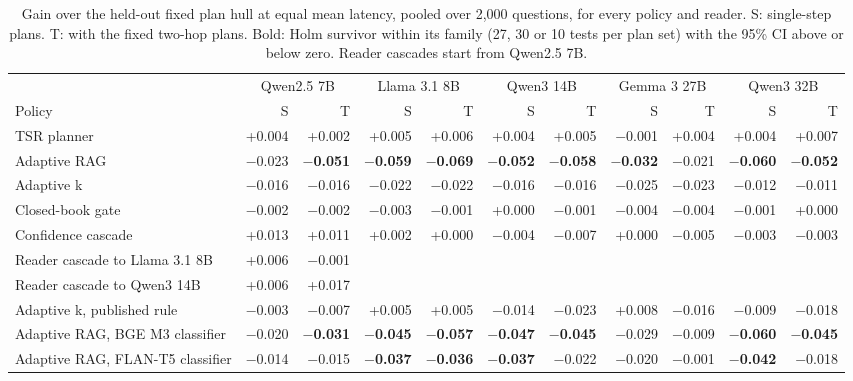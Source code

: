 \begin{table}[t]
\centering\footnotesize
\setlength{\tabcolsep}{4pt}
\caption{Gain over the held-out fixed plan hull at equal mean latency, pooled over 2,000 questions, for every policy and reader. S: single-step plans. T: with the fixed two-hop plans. Bold: Holm survivor within its family (27, 30 or 10 tests per plan set) with the 95\% CI above or below zero. Reader cascades start from Qwen2.5 7B.}
\label{tab:p_gains}
\begin{tabular*}{\linewidth}{@{\extracolsep{\fill}}lrrrrrrrrrr@{}}
\toprule
 & \multicolumn{2}{c}{Qwen2.5 7B} & \multicolumn{2}{c}{Llama 3.1 8B} & \multicolumn{2}{c}{Qwen3 14B} & \multicolumn{2}{c}{Gemma 3 27B} & \multicolumn{2}{c}{Qwen3 32B} \\
\cmidrule(lr){2-3}\cmidrule(lr){4-5}\cmidrule(lr){6-7}\cmidrule(lr){8-9}\cmidrule(l){10-11}
Policy & S & T & S & T & S & T & S & T & S & T \\
\midrule
TSR planner & +0.004 & +0.002 & +0.005 & +0.006 & +0.004 & +0.005 & $-$0.001 & +0.004 & +0.004 & +0.007 \\
Adaptive RAG & $-$0.023 & \textbf{$-$0.051} & \textbf{$-$0.059} & \textbf{$-$0.069} & \textbf{$-$0.052} & \textbf{$-$0.058} & \textbf{$-$0.032} & $-$0.021 & \textbf{$-$0.060} & \textbf{$-$0.052} \\
Adaptive k & $-$0.016 & $-$0.016 & $-$0.022 & $-$0.022 & $-$0.016 & $-$0.016 & $-$0.025 & $-$0.023 & $-$0.012 & $-$0.011 \\
Closed-book gate & $-$0.002 & $-$0.002 & $-$0.003 & $-$0.001 & +0.000 & $-$0.001 & $-$0.004 & $-$0.004 & $-$0.001 & +0.000 \\
Confidence cascade & +0.013 & +0.011 & +0.002 & +0.000 & $-$0.004 & $-$0.007 & +0.000 & $-$0.005 & $-$0.003 & $-$0.003 \\
Reader cascade to Llama 3.1 8B & +0.006 & $-$0.001 &  &  &  &  &  &  &  &  \\
Reader cascade to Qwen3 14B & +0.006 & +0.017 &  &  &  &  &  &  &  &  \\
\midrule
Adaptive k, published rule & $-$0.003 & $-$0.007 & +0.005 & +0.005 & $-$0.014 & $-$0.023 & +0.008 & $-$0.016 & $-$0.009 & $-$0.018 \\
Adaptive RAG, BGE M3 classifier & $-$0.020 & \textbf{$-$0.031} & \textbf{$-$0.045} & \textbf{$-$0.057} & \textbf{$-$0.047} & \textbf{$-$0.045} & $-$0.029 & $-$0.009 & \textbf{$-$0.060} & \textbf{$-$0.045} \\
Adaptive RAG, FLAN-T5 classifier & $-$0.014 & $-$0.015 & \textbf{$-$0.037} & \textbf{$-$0.036} & \textbf{$-$0.037} & $-$0.022 & $-$0.020 & $-$0.001 & \textbf{$-$0.042} & $-$0.018 \\

\end{tabular*}
\end{table}

